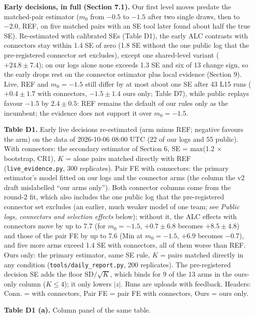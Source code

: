\documentclass[
]{article}
\begin{document}
\textbf{Early decisions, in full (Section 7.1).} Our first level moves
predate the matched-pair estimator (\(m_0\) from \(-0.5\) to \(-1.5\)
after two single draws, then to \(-2.0\), REF, on five matched pairs
with an SE tool later found about half the true SE). Re-estimated with
calibrated SEs (Table D1), the early ALC contrasts with connectors stay
within 1.4 SE of zero (1.8 SE without the one public log that the
pre-registered connector set excludes), except one shared-level variant
(\(+24.8 \pm 7.4\)); on our logs alone none exceeds 1.3 SE and six of 13
change sign, so the early drops rest on the connector estimator plus
local evidence (Section 9). Live, REF and \(m_0 = -1.5\) still differ by
at most about one SE after 43 L15 runs (\(+0.4 \pm 1.7\) with
connectors, \(-1.5 \pm 1.4\) ours only; Table D7), while public replays
favour \(-1.5\) by \(2.4 \pm 0.5\): REF remains the default of our rules
only as the incumbent; the evidence does not support it over
\(m_0 = -1.5\).

\textbf{Table D1.} Early live decisions re-estimated (arm minus REF;
negative favours the arm) on the data of 2026-10-06 08:00 UTC (22 of our
logs and 55 public). With connectors: the secondary estimator of Section
6, SE = max(1.2 × bootstrap, CR1), \(K\) = alone pairs matched directly
with REF (\texttt{live\_evidence.py}, 300 replicates). Pair FE with
connectors: the primary estimator's model fitted on our logs and the
connector arms (the column the v2 draft mislabelled ``our arms only'').
Both connector columns come from the round-2 fit, which also includes
the one public log that the pre-registered connector set excludes (an
earlier, much weaker model of one team; see \emph{Public logs,
connectors and selection effects} below); without it, the ALC effects
with connectors move by up to 7.7 (for \(m_0 = -1.5\), \(+0.7 \pm
6.8\) becomes \(+8.5 \pm 4.8\)) and those of the pair FE by up to 7.6
(Min at \(m_0 = -1.5\), \(+6.9\) becomes \(-0.7\)), and five more arms
exceed 1.4 SE with connectors, all of them worse than REF. Ours only:
the primary estimator, same SE rule, \(K\) = pairs matched directly in
any condition (\texttt{tools/daily\_report.py}, 200 replicates). The
pre-registered decision SE adds the floor \(\mathrm{SD}/\sqrt{K}\),
which binds for 9 of the 13 arms in the ours-only column (\(K \le 4\));
it only lowers \(|z|\). Runs are uploads with feedback. Headers: Conn. =
with connectors, Pair FE = pair FE with connectors, Ours = ours only.

\textbf{Table D1 (a).} Column panel of the same table.
\end{document}

